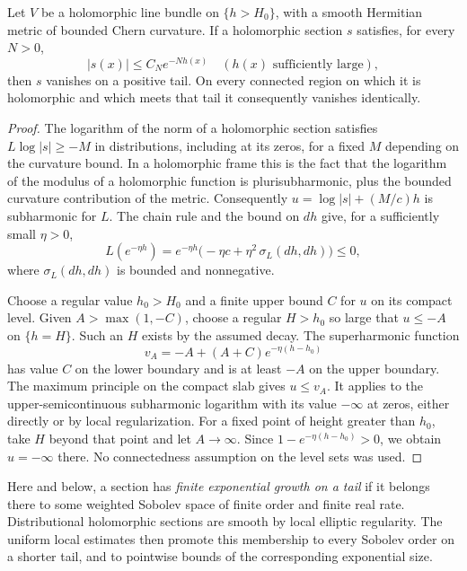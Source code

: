 \begin{lemma}\label{weighted:nondecay}
Let $V$ be a holomorphic line bundle on $\{h>H_0\}$, with a smooth
Hermitian metric of bounded Chern curvature. If a holomorphic section
$s$ satisfies, for every $N>0$,
\[
 |s(x)|\le C_Ne^{-Nh(x)}\quad(h(x)\text{ sufficiently large}),
\]
then $s$ vanishes on a positive tail. On every connected region on which
it is holomorphic and which meets that tail it consequently vanishes
identically.
\end{lemma}

\begin{proof}
The logarithm of the norm of a holomorphic section satisfies
$L\log|s|\ge-M$ in distributions, including at its zeros, for a fixed
$M$ depending on the curvature bound. In a holomorphic frame this is
the fact that the logarithm of the modulus of a holomorphic function is
plurisubharmonic, plus the bounded curvature contribution of the metric.
Consequently
$u=\log|s|+(M/c)h$ is subharmonic for $L$.
The chain rule and the bound on $dh$ give, for a sufficiently small
$\eta>0$,
\[
 L(e^{-\eta h})
 =e^{-\eta h}\bigl(-\eta c+\eta^2\,\sigma_L(dh,dh)\bigr)\le0,
\]
where $\sigma_L(dh,dh)$ is bounded and nonnegative.

Choose a regular value $h_0>H_0$ and a finite upper bound $C$ for $u$
on its compact level. Given $A>\max(1,-C)$, choose a regular $H>h_0$
so large that $u\le-A$ on $\{h=H\}$. Such an $H$ exists by the assumed
decay. The superharmonic function
\[
 v_A=-A+(A+C)e^{-\eta(h-h_0)}
\]
has value $C$ on the lower boundary and is at least $-A$ on the upper
boundary. The maximum principle on the compact slab gives $u\le v_A$.
It applies to the upper-semicontinuous subharmonic logarithm with its
value $-\infty$ at zeros, either directly or by local regularization.
For a fixed point of height greater than $h_0$, take $H$ beyond that
point and let $A\to\infty$. Since
$1-e^{-\eta(h-h_0)}>0$, we obtain $u=-\infty$ there. No connectedness
assumption on the level sets was used.
\end{proof}

Here and below, a section has \emph{finite exponential growth on a tail}
if it belongs there to some weighted Sobolev space of finite order and
finite real rate. Distributional holomorphic sections are smooth by
local elliptic regularity. The uniform local estimates then promote
this membership to every Sobolev order on a shorter tail, and to
pointwise bounds of the corresponding exponential size.

